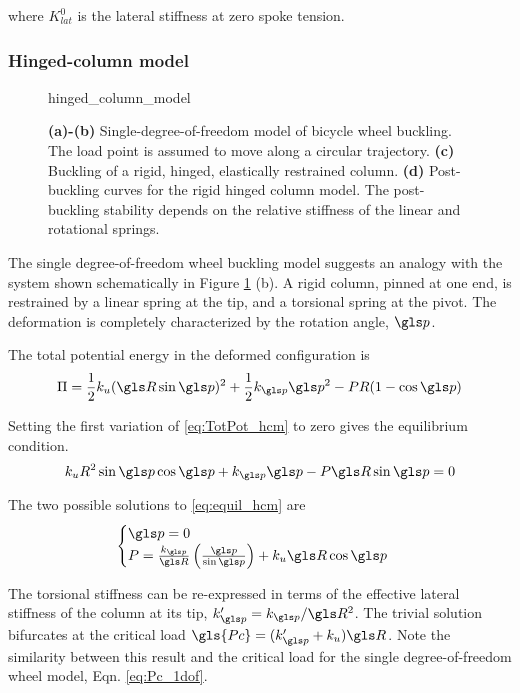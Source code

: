 \documentclass[\rootdir/thesis.tex]{subfiles}
\begin{document}
where $K_{lat}^0$ is the lateral stiffness at zero spoke tension.

\subsubsection{Hinged-column model}

\begin{figure}[t]	
\centering
{hinged_column_model}
\caption{\textbf{(a)-(b)} Single-degree-of-freedom model of bicycle wheel buckling. The load point is assumed to move along a circular trajectory. \textbf{(c)} Buckling of a rigid, hinged, elastically restrained column. \textbf{(d)} Post-buckling curves for the rigid hinged column model. The post-buckling stability depends on the relative stiffness of the linear and rotational springs.}
\label{fig:hinged_column_model}
\end{figure}

The single degree-of-freedom wheel buckling model suggests an analogy with the system shown schematically in Figure \ref{fig:hinged_column_model} (b). A rigid column, pinned at one end, is restrained by a linear spring at the tip, and a torsional spring at the pivot. The deformation is completely characterized by the rotation angle, $\p$.

The total potential energy in the deformed configuration is
\begin{equation}
\label{eq:TotPot_hcm}
\Pi = \frac{1}{2}k_u(\R\sin{\p})^2 + \frac{1}{2}k_{\p}\p^2
    - PR(1-\cos{\p})
\end{equation}

Setting the first variation of \eqref{eq:TotPot_hcm} to zero gives the equilibrium condition.
\begin{equation}
\label{eq:equil_hcm}
k_u R^2 \sin{\p}\cos{\p} + k_{\p}\p - P\R\sin{\p} = 0
\end{equation}

The two possible solutions to \eqref{eq:equil_hcm} are
\begin{equation}
\label{eq:P_hcm}
\begin{cases}
\p = 0\\
P = \frac{k_{\p}}{\R}\left(\frac{\p}{\sin{\p}}\right) + k_u \R\cos{\p}
\end{cases}
\end{equation}

The torsional stiffness can be re-expressed in terms of the effective lateral stiffness of the column at its tip, $k'_{\p}=k_{\p}/\R^2$. The trivial solution bifurcates at the critical load $\gls{Pc}=(k'_{\p} + k_u) \R$. Note the similarity between this result and the critical load for the single degree-of-freedom wheel model, Eqn. \eqref{eq:Pc_1dof}.
\end{document}
